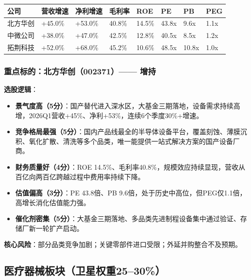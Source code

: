 \begin{exhibitbox}
\centering
\scriptsize
\setlength{\tabcolsep}{3pt}
\begin{tabularx}{\linewidth}{X C{1.4cm} C{1.4cm} C{1.2cm} C{1.0cm} C{1.1cm} C{1.0cm} C{1.0cm}}
\toprule
\textbf{公司} & \textbf{营收增速} & \textbf{净利增速} & \textbf{毛利率} & \textbf{ROE} & \textbf{PE} & \textbf{PB} & \textbf{PEG} \\
\midrule
北方华创 & +45.0\% & +53.0\% & 40.8\% & 14.5\% & 43.8x & 9.6x & 1.1x \\
中微公司 & +38.0\% & +47.0\% & 42.5\% & 12.8\% & 40.5x & 8.5x & 1.2x \\
拓荆科技 & +52.0\% & +68.0\% & 45.2\% & 10.6\% & 48.5x & 10.8x & 1.0x \\
\bottomrule
\end{tabularx}
\end{exhibitbox}

\subsubsection*{重点标的：北方华创（002371）—— 增持}

\textbf{选股逻辑}：
\vspace{0.2em}
\begin{itemize}[leftmargin=2em]
\item \textbf{景气度高（5分）}：国产替代进入深水区，大基金三期落地，设备需求持续高增，2026Q1营收+45\%、净利+53\%，连续6个季度30\%+增速。
\item \textbf{竞争格局最强（5分）}：国内产品线最全的半导体设备平台，覆盖刻蚀、薄膜沉积、氧化扩散、清洗等多个品类，唯一能提供一站式解决方案的国产设备厂商。
\item \textbf{财务质量好（4分）}：ROE 14.5\%、毛利率40.8\%，规模效应持续显现，营收从百亿向两百亿跨越过程中费用率持续下降。
\item \textbf{估值偏高（3分）}：PE 43.8倍、PB 9.6倍，处于历史中高位，但PEG仅1.1倍，高增长消化估值能力强。
\item \textbf{催化剂密集（5分）}：大基金三期落地、多品类先进制程设备集中通过验证、存储厂新一轮扩产启动。
\end{itemize}

\textbf{核心风险}：部分品类竞争加剧；关键零部件进口受限；外延并购整合不及预期。

\subsection{医疗器械板块（卫星权重25--30\%）}

